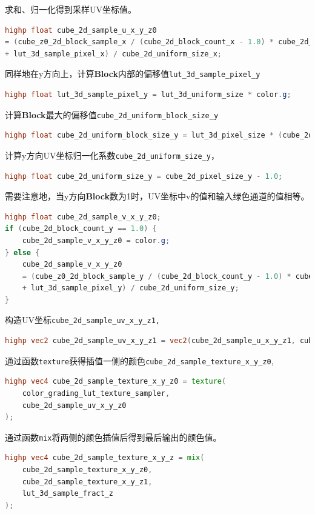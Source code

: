 \documentclass{ctexart}
\begin{document}
    求和、归一化得到采样UV坐标值。
    \begin{lstlisting}[language=GLSL]
highp float cube_2d_sample_u_x_y_z0 
= (cube_z0_2d_block_sample_x / (cube_2d_block_count_x - 1.0) * cube_2d_uniform_block_size_x 
+ lut_3d_sample_pixel_x) / cube_2d_uniform_size_x;
    \end{lstlisting}
    同样地在y方向上，计算\textbf{Block}内部的偏移值\verb|lut_3d_sample_pixel_y|
    \begin{lstlisting}[language=GLSL]
highp float lut_3d_sample_pixel_y = lut_3d_uniform_size * color.g;
    \end{lstlisting}
    计算\textbf{Block}最大的偏移值\verb|cube_2d_uniform_block_size_y|
    \begin{lstlisting}[language=GLSL]
highp float cube_2d_uniform_block_size_y = lut_3d_pixel_size * (cube_2d_block_count_y - 1.0);
    \end{lstlisting}
    计算y方向UV坐标归一化系数\verb|cube_2d_uniform_size_y|，
    \begin{lstlisting}[language=GLSL]
highp float cube_2d_uniform_size_y = cube_2d_pixel_size_y - 1.0;
    \end{lstlisting}
    需要注意地，当y方向\textbf{Block}数为1时，UV坐标中v的值和输入绿色通道的值相等。
    \begin{lstlisting}[language=GLSL]
highp float cube_2d_sample_v_x_y_z0;
if (cube_2d_block_count_y == 1.0) {
    cube_2d_sample_v_x_y_z0 = color.g;
} else {
    cube_2d_sample_v_x_y_z0 
    = (cube_z0_2d_block_sample_y / (cube_2d_block_count_y - 1.0) * cube_2d_uniform_block_size_y 
    + lut_3d_sample_pixel_y) / cube_2d_uniform_size_y;
}
    \end{lstlisting}
    构造UV坐标\verb|cube_2d_sample_uv_x_y_z1,|
\begin{lstlisting}[language=GLSL]
highp vec2 cube_2d_sample_uv_x_y_z1 = vec2(cube_2d_sample_u_x_y_z1, cube_2d_sample_v_x_y_z1);
\end{lstlisting}    
    通过函数\verb|texture|获得插值一侧的颜色\verb|cube_2d_sample_texture_x_y_z0|,
\begin{lstlisting}[language=GLSL]
highp vec4 cube_2d_sample_texture_x_y_z0 = texture(
    color_grading_lut_texture_sampler,
    cube_2d_sample_uv_x_y_z0
);
\end{lstlisting}     
    通过函数\verb|mix|将两侧的颜色插值后得到最后输出的颜色值。
\begin{lstlisting}[language=GLSL]
highp vec4 cube_2d_sample_texture_x_y_z = mix(
    cube_2d_sample_texture_x_y_z0, 
    cube_2d_sample_texture_x_y_z1, 
    lut_3d_sample_fract_z
);
\end{lstlisting}
\end{document}
